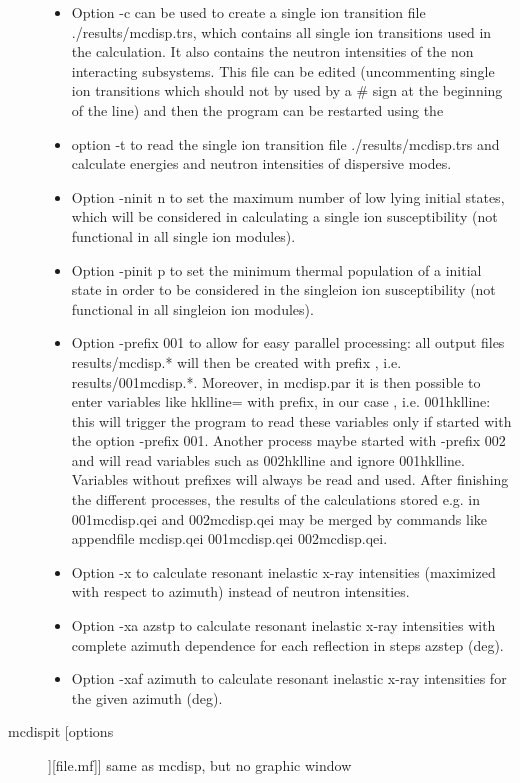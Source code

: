 \begin{description}
\begin{itemize}
				\item Option {\prg -c}  can be used to create  a single ion
				transition file {\prg ./results/mcdisp.trs}, which contains
				all single ion transitions used in the calculation. It also contains the 
                                    neutron intensities of the non interacting subsystems. This file can
				be edited (uncommenting single ion transitions which should not
				by used by a \# sign at the beginning of the line)
				and then the program can be restarted using the 
				\item  option {\prg -t} to
				read the single ion transition file {\prg ./results/mcdisp.trs} and
				calculate energies and neutron intensities of dispersive modes.
				\item Option {\prg -ninit n} to set the maximum number of low lying
                                 initial states, which will be considered in calculating a single ion susceptibility (not functional
                                 in all single ion modules).
 \item Option {\prg -pinit p} to set the minimum thermal population of a 
                                 initial state in order to be considered in the singleion ion susceptibility (not functional in
                                 all singleion ion modules).
 \item Option {\prg -prefix 001} to allow for easy parallel processing: all output files {\prg results/mcdisp.*}
                  will then be created with prefix {}, i.e. {\prg results/001mcdisp.*}.
                  Moreover,  in {\prg mcdisp.par} it is then possible to enter
                  variables like {\prg hklline=}  with prefix, in our case {}, i.e. {\prg 001hklline}: this will trigger
                  the program to read these variables only if started with the option {\prg -prefix 001}. Another process
                  maybe started with {\prg -prefix 002} and will read variables such as {\prg 002hklline} and ignore {\prg 001hklline}.
                  Variables without prefixes will always be read and used.
                  After finishing the different processes, the results of the calculations stored e.g. in {\prg 001mcdisp.qei} and
                  {\prg 002mcdisp.qei} may be merged by commands like {\prg appendfile mcdisp.qei 001mcdisp.qei 002mcdisp.qei}.
    \item Option {\prg -x} to calculate resonant inelastic x-ray intensities (maximized with respect to azimuth) instead of neutron intensities.
    \item Option {\prg -xa  azstp} to calculate resonant inelastic x-ray intensities with complete azimuth dependence for each reflection in steps azstep (deg).
    \item Option {\prg -xaf  azimuth} to calculate resonant inelastic x-ray intensities for the given azimuth (deg).
				\end{itemize}
\item [\prg mcdispit [options]][file.mf]]  same as {\prg mcdisp}, but no graphic window
\end{description} 

